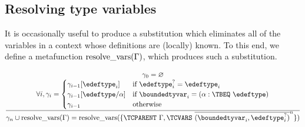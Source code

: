 \subsection{Resolving type variables}

It is occasionally useful to produce a substitution which eliminates
all of the variables in a context whose definitions are (locally)
known. To this end, we define a metafunction $\mathop{\mathrm{resolve\_vars}}(\Gamma)$,
which produces such a substitution.

\[
  \frac{
    \begin{array}{@{}c@{}}
      \subst_0 = \varnothing\\
      \forall i, \subst_i =
      \begin{cases}
        \subst_{i-1}[\edeftype_i] & \text{if } \edeftype^?_i = \edeftype_i\\
        \subst_{i-1}[\edeftype/\alpha] & \text{if } \boundedtyvar_i = (\alpha : \TBEQ~\edeftype)\\
        \subst_{i-1} & \text{otherwise}
      \end{cases}
    \end{array}
  }{
    \subst_n \cup \resolveVars{\Gamma} = \resolveVars{\{ \TCPARENT~\Gamma, \TCVARS~\overline{(\boundedtyvar_i, \edeftype^?_i)}^n \}}
  }
\]
